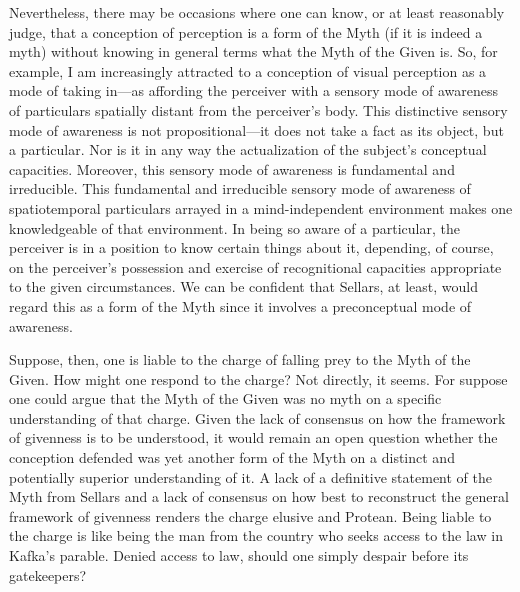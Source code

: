 \documentclass[12pt]{article}
\begin{document}
Nevertheless, there may be occasions where one can know, or at least reasonably judge, that a conception of perception is a form of the Myth (if it is indeed a myth) without knowing in general terms what the Myth of the Given is. So, for example, I am increasingly attracted to a conception of visual perception as a mode of taking in---as affording the perceiver with a sensory mode of awareness of particulars spatially distant from the perceiver's body. This distinctive sensory mode of awareness is not propositional---it does not take a fact as its object, but a particular. Nor is it in any way the actualization of the subject's conceptual capacities. Moreover, this sensory mode of awareness is fundamental and irreducible. This fundamental and irreducible sensory mode of awareness of spatiotemporal particulars arrayed in a mind-independent environment makes one knowledgeable of that environment. In being so aware of a particular, the perceiver is in a position to know certain things about it, depending, of course, on the perceiver's possession and exercise of recognitional capacities appropriate to the given circumstances. We can be confident that Sellars, at least, would regard this as a form of the Myth since it involves a preconceptual mode of awareness.

Suppose, then, one is liable to the charge of falling prey to the Myth of the Given. How might one respond to the charge? Not directly, it seems. For suppose one could argue that the Myth of the Given was no myth on a specific understanding of that charge. Given the lack of consensus on how the framework of givenness is to be understood, it would remain an open question whether the conception defended was yet another form of the Myth on a distinct and potentially superior understanding of it. A lack of a definitive statement of the Myth from Sellars and a lack of consensus on how best to reconstruct the general framework of givenness renders the charge elusive and Protean. Being liable to the charge is like being the man from the country who seeks access to the law in Kafka's parable. Denied access to law, should one simply despair before its gatekeepers?
\end{document}
